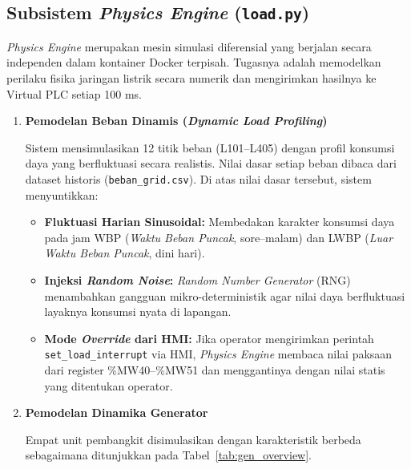 \subsection{Subsistem \textit{Physics Engine} (\texttt{load.py})}
\label{subsec:Physics_Engine}

\textit{Physics Engine} merupakan mesin simulasi diferensial yang berjalan secara independen dalam kontainer Docker terpisah.
Tugasnya adalah memodelkan perilaku fisika jaringan listrik secara numerik dan mengirimkan hasilnya ke Virtual PLC setiap 100 ms.

\begin{enumerate}
\item[a.] \textbf{Pemodelan Beban Dinamis (\textit{Dynamic Load Profiling})}

Sistem mensimulasikan 12 titik beban (L101--L405) dengan profil konsumsi daya yang berfluktuasi secara realistis.
Nilai dasar setiap beban dibaca dari dataset historis (\texttt{beban\_grid.csv}). Di atas nilai dasar tersebut, sistem menyuntikkan:

\begin{itemize}
    \item[i.] \textbf{Fluktuasi Harian Sinusoidal:} Membedakan karakter konsumsi daya pada jam WBP (\textit{Waktu Beban Puncak}, sore--malam) dan LWBP (\textit{Luar Waktu Beban Puncak}, dini hari).
    \item[ii.] \textbf{Injeksi \textit{Random Noise}:} \textit{Random Number Generator} (RNG) menambahkan gangguan mikro-deterministik agar nilai daya berfluktuasi layaknya konsumsi nyata di lapangan.
    \item[iii.] \textbf{Mode \textit{Override} dari HMI:} Jika operator mengirimkan perintah \texttt{set\_load\_interrupt} via HMI, \textit{Physics Engine} membaca nilai paksaan dari register \%MW40--\%MW51 dan menggantinya dengan nilai statis yang ditentukan operator.
\end{itemize}

\item[b.] \textbf{Pemodelan Dinamika Generator}

Empat unit pembangkit disimulasikan dengan karakteristik berbeda sebagaimana ditunjukkan pada Tabel~\ref{tab:gen_overview}.


\end{enumerate}
